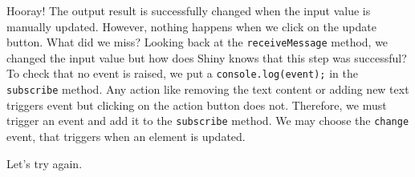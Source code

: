 \documentclass[
]{book}
\newenvironment{Shaded}{\begin{snugshade}}{\end{snugshade}}
\newcommand{\AttributeTok}[1]{\textcolor[rgb]{0.77,0.63,0.00}{#1}}
\newcommand{\KeywordTok}[1]{\textcolor[rgb]{0.13,0.29,0.53}{\textbf{#1}}}
\newcommand{\NormalTok}[1]{#1}
\newcommand{\OperatorTok}[1]{\textcolor[rgb]{0.81,0.36,0.00}{\textbf{#1}}}
\newcommand{\StringTok}[1]{\textcolor[rgb]{0.31,0.60,0.02}{#1}}
\begin{document}
Hooray! The output result is successfully changed when the input value is manually updated. However, nothing happens when we click on the update button. What did we miss? Looking back at the \texttt{receiveMessage} method, we changed the input value but how does Shiny knows that this step was successful? To check that no event is raised, we put a \texttt{console.log(event);} in the \texttt{subscribe} method. Any action like removing the text content or adding new text triggers event but clicking on the action button does not. Therefore, we must trigger an event and add it to the \texttt{subscribe} method. We may choose the \texttt{change} event, that triggers when an element is updated.

\begin{Shaded}
\end{Shaded}

Let's try again.
\end{document}
